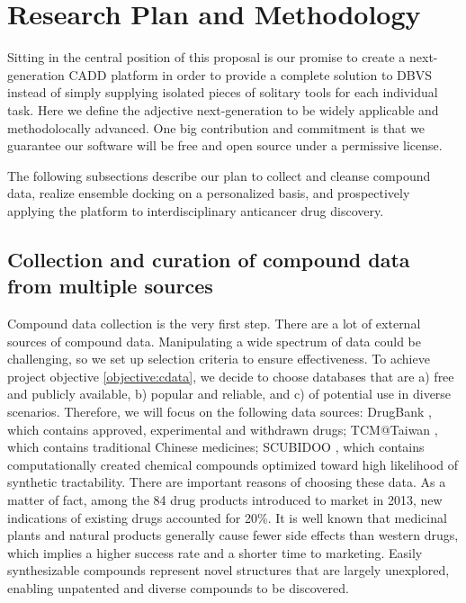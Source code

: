 \documentclass[a4paper,12pt]{article}
\begin{document}
\section*{Research Plan and Methodology}

Sitting in the central position of this proposal is our promise to create a next-generation CADD platform in order to provide a complete solution to DBVS instead of simply supplying isolated pieces of solitary tools for each individual task. Here we define the adjective next-generation to be widely applicable and methodolocally advanced. One big contribution and commitment is that we guarantee our software will be free and open source under a permissive license.

The following subsections describe our plan to collect and cleanse compound data, realize ensemble docking on a personalized basis, and prospectively applying the platform to interdisciplinary anticancer drug discovery.

\subsection*{Collection and curation of compound data from multiple sources}

Compound data collection is the very first step. There are a lot of external sources of compound data. Manipulating a wide spectrum of data could be challenging, so we set up selection criteria to ensure effectiveness. To achieve project objective \ref{objective:cdata}, we decide to choose databases that are a) free and publicly available, b) popular and reliable, and c) of potential use in diverse scenarios. Therefore, we will focus on the following data sources: DrugBank \citep{1594}, which contains approved, experimental and withdrawn drugs; TCM@Taiwan \citep{528}, which contains traditional Chinese medicines; SCUBIDOO \citep{1682}, which contains computationally created chemical compounds optimized toward high likelihood of synthetic tractability. There are important reasons of choosing these data. As a matter of fact, among the 84 drug products introduced to market in 2013, new indications of existing drugs accounted for 20\%. It is well known that medicinal plants and natural products generally cause fewer side effects than western drugs, which implies a higher success rate and a shorter time to marketing. Easily synthesizable compounds represent novel structures that are largely unexplored, enabling unpatented and diverse compounds to be discovered.
\end{document}
